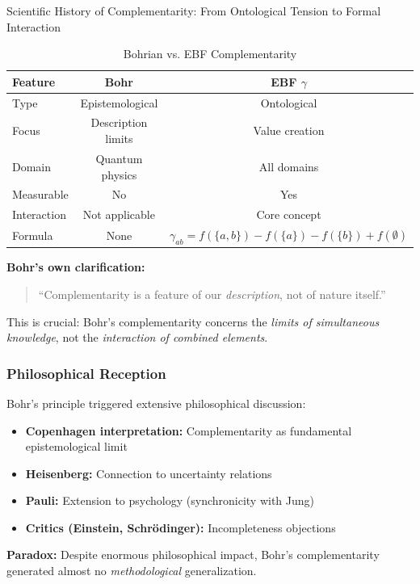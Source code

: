 \begin{chapter}{Scientific History of Complementarity: From Ontological Tension to Formal Interaction}
\begin{table}[h]
\centering
\caption{Bohrian vs. EBF Complementarity}
\label{tab:bohr-vs-ebf}
\renewcommand{\arraystretch}{1.3}
\begin{tabular}{@{}lcc@{}}
\toprule
\textbf{Feature} & \textbf{Bohr} & \textbf{EBF $\gamma$} \\
\midrule
Type & Epistemological & Ontological \\
Focus & Description limits & Value creation \\
Domain & Quantum physics & All domains \\
Measurable & No & Yes \\
Interaction & Not applicable & Core concept \\
Formula & None & $\gamma_{ab} = f(\{a,b\}) - f(\{a\}) - f(\{b\}) + f(\emptyset)$ \\
\bottomrule
\end{tabular}
\end{table}

\textbf{Bohr's own clarification:}
\begin{quote}
``Complementarity is a feature of our \textit{description}, not of nature itself.''
\end{quote}

This is crucial: Bohr's complementarity concerns the \textit{limits of simultaneous knowledge}, not the \textit{interaction of combined elements}.

\subsubsection{Philosophical Reception}

Bohr's principle triggered extensive philosophical discussion:

\begin{itemize}[noitemsep]
    \item \textbf{Copenhagen interpretation:} Complementarity as fundamental epistemological limit
    \item \textbf{Heisenberg:} Connection to uncertainty relations
    \item \textbf{Pauli:} Extension to psychology (synchronicity with Jung)
    \item \textbf{Critics (Einstein, Schrödinger):} Incompleteness objections
\end{itemize}

\textbf{Paradox:} Despite enormous philosophical impact, Bohr's complementarity generated almost no \textit{methodological} generalization.


\end{chapter}
